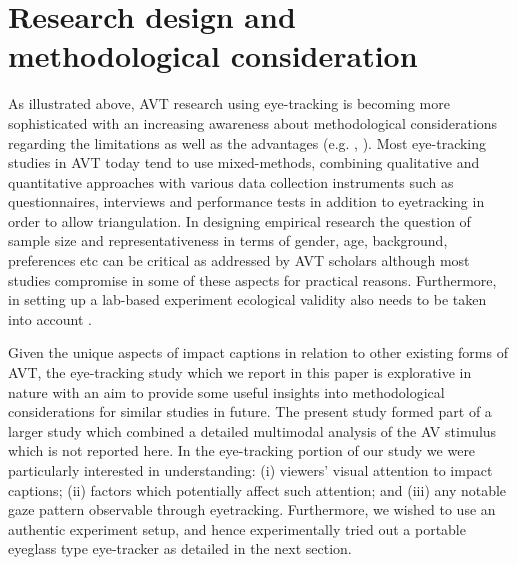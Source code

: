 \documentclass[output=paper]{langsci/langscibook}
\begin{document}
\section{Research design and methodological consideration}

As illustrated above, AVT research using eye-tracking is becoming more sophisticated with an increasing awareness about methodological considerations regarding the limitations as well as the advantages (e.g. \citet{perego2010}, \citet{Kruger2015}). Most eye-tracking studies in AVT today tend to use mixed-methods, combining qualitative and quantitative approaches with various data collection instruments such as questionnaires, interviews and performance tests in addition to eyetracking in order to allow triangulation. In designing empirical research the question of sample size and representativeness in terms of gender, age, background, preferences etc can be critical as addressed by AVT scholars although most studies compromise in some of these aspects for practical reasons. Furthermore, in setting up a lab-based experiment ecological validity also needs to be taken into account \citep{jakobsen2014}.  


Given the unique aspects of impact captions in relation to other existing forms of AVT, the eye-tracking study which we report in this paper is explorative in nature with an aim to provide some useful insights into methodological considerations for similar studies in future. The present study formed part of a larger study which combined a detailed multimodal analysis of the AV stimulus which is not reported here. In the eye-tracking portion of our study we were particularly interested in understanding: (i) viewers' visual attention to impact captions; (ii) factors which potentially affect such attention; and (iii) any notable gaze pattern observable through eyetracking. Furthermore, we wished to use an authentic experiment setup, and hence experimentally tried out a portable eyeglass type eye-tracker as detailed in the next section. 
\end{document}
